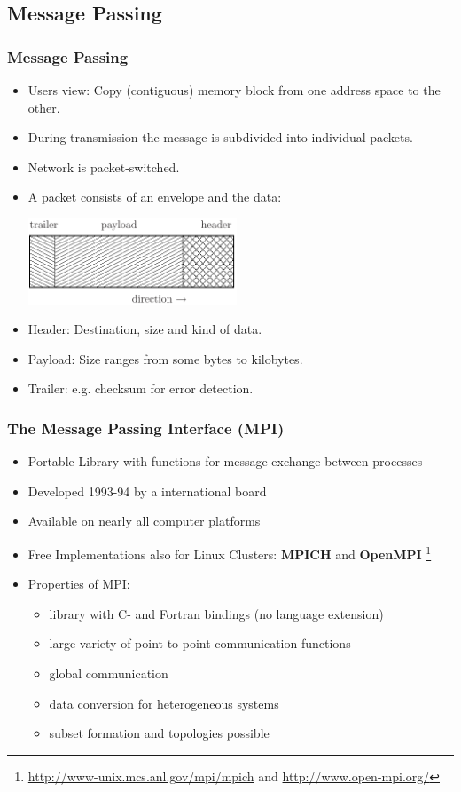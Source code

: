 \documentclass[aspectratio=169,11pt]{beamer}
\theoremstyle{definition}
\begin{document}
\subsection{Message Passing}
\begin{frame}
\frametitle<presentation>{Message Passing}

\begin{itemize}
\item Users view: Copy (contiguous) memory block from one address space to the
  other.
\item During transmission the message is subdivided into individual packets.
\item Network is packet-switched.
\item A packet consists of an envelope and
  the data:
\begin{center}
  \includegraphics[width=0.49\textwidth]{paket}
\end{center}
\item Header: Destination, size and kind of data.
\item Payload: Size ranges from some bytes to kilobytes.
\item Trailer: e.g. checksum for error detection.
\end{itemize}
\end{frame}

\begin{frame}
\frametitle{The Message Passing Interface (MPI)}

\begin{itemize}
\item Portable Library with functions for message exchange between processes
\item Developed 1993-94 by a international board
\item Available on nearly all computer platforms
\item Free Implementations also for Linux Clusters: {\bfseries MPICH}
 and {\bfseries OpenMPI} \footnote{\tiny \url{http://www-unix.mcs.anl.gov/mpi/mpich} and \url{http://www.open-mpi.org/}}
\item Properties of MPI:
\begin{itemize}
\item library with C- and Fortran bindings (no language extension)
\item large variety of point-to-point communication functions
\item global communication
\item data conversion for heterogeneous systems
\item subset formation and topologies possible
\end{itemize}
\end{itemize}
\end{frame}
\end{document}

